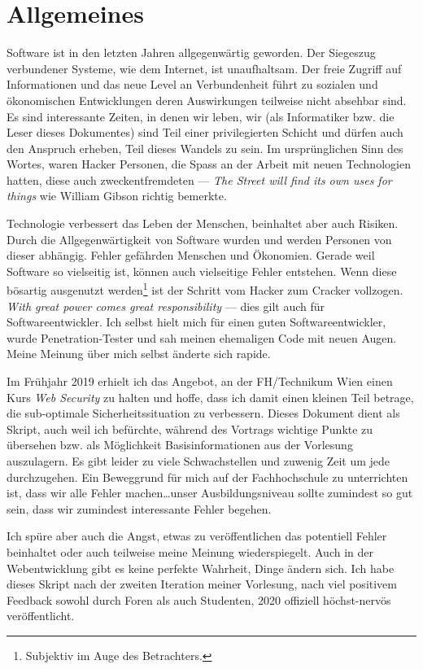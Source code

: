 \chapter{Allgemeines}

Software ist in den letzten Jahren allgegenwärtig geworden. Der Siegeszug verbundener Systeme, wie dem Internet,  ist unaufhaltsam. Der freie Zugriff auf Informationen und das neue Level an Verbundenheit führt zu sozialen und ökonomischen Entwicklungen deren Auswirkungen teilweise nicht absehbar sind. Es sind interessante Zeiten, in denen wir leben, wir (als Informatiker bzw. die Leser dieses Dokumentes) sind Teil einer privilegierten Schicht und dürfen auch den Anspruch erheben, Teil dieses Wandels zu sein. Im ursprünglichen Sinn des Wortes, waren Hacker Personen, die Spass an der Arbeit mit neuen Technologien hatten, diese auch zweckentfremdeten --- \textit{The Street will find its own uses for things} wie William Gibson richtig bemerkte.

Technologie verbessert das Leben der Menschen, beinhaltet aber auch Risiken. Durch die Allgegenwärtigkeit von Software wurden und werden Personen von dieser abhängig. Fehler gefährden Menschen und Ökonomien. Gerade weil Software so vielseitig ist, können auch vielseitige Fehler entstehen. Wenn diese bösartig ausgenutzt werden\footnote{Subjektiv im Auge des Betrachters.} ist der Schritt vom Hacker zum Cracker vollzogen. \textit{With great power comes great responsibility} --- dies gilt auch für Softwareentwickler. Ich selbst hielt mich für einen guten Softwareentwickler, wurde Penetration-Tester und sah meinen ehemaligen Code mit neuen Augen. Meine Meinung über mich selbst änderte sich rapide.

Im Frühjahr 2019 erhielt ich das Angebot, an der FH/Technikum Wien einen Kurs \textit{Web Security} zu halten und hoffe, dass ich damit einen kleinen Teil betrage, die sub-optimale Sicherheitssituation zu verbessern. Dieses Dokument dient als Skript, auch weil ich befürchte, während des Vortrags wichtige Punkte zu übersehen bzw. als Möglichkeit Basisinformationen aus der Vorlesung auszulagern. Es gibt leider zu viele Schwachstellen und zuwenig Zeit um jede durchzugehen. Ein Beweggrund für mich auf der Fachhochschule zu unterrichten ist, dass wir alle Fehler machen\ldots unser Ausbildungsniveau sollte zumindest so gut sein, dass wir zumindest interessante Fehler begehen.

Ich spüre aber auch die Angst, etwas zu veröffentlichen das potentiell Fehler beinhaltet oder auch teilweise meine Meinung wiederspiegelt. Auch in der Webentwicklung gibt es keine perfekte Wahrheit, Dinge ändern sich. Ich habe dieses Skript nach der zweiten Iteration meiner Vorlesung, nach viel positivem Feedback sowohl durch Foren als auch Studenten, 2020 offiziell höchst-nervös veröffentlicht.

